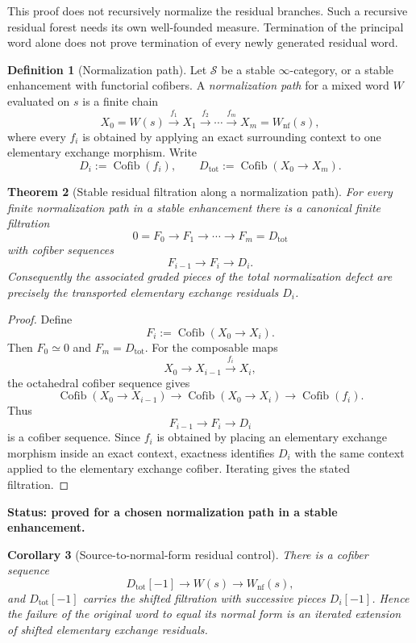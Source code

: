\documentclass[11pt]{article}
\newtheorem{theorem}{Theorem}[section]
\newtheorem{corollary}[theorem]{Corollary}
\theoremstyle{definition}
\newtheorem{definition}[theorem]{Definition}
\theoremstyle{remark}
\newcommand{\Cofib}{\operatorname{Cofib}}
\newcommand{\status}[1]{\textbf{Status: #1.}}
\begin{document}
This proof does not recursively normalize the residual branches. Such a recursive residual forest needs its own well-founded measure. Termination of the principal word alone does not prove termination of every newly generated residual word.

\begin{definition}[Normalization path]
Let $\mathcal S$ be a stable $\infty$-category, or a stable enhancement with functorial cofibers. A \emph{normalization path} for a mixed word $W$ evaluated on $s$ is a finite chain
\[
X_0=W(s)\xrightarrow{f_1}X_1\xrightarrow{f_2}\cdots\xrightarrow{f_m}X_m=W_{\mathrm{nf}}(s),
\]
where every $f_i$ is obtained by applying an exact surrounding context to one elementary exchange morphism. Write
\[
D_i:=\Cofib(f_i),
\qquad
D_{\mathrm{tot}}:=\Cofib(X_0\to X_m).
\]
\end{definition}

\begin{theorem}[Stable residual filtration along a normalization path]\label{thm:stable-filtration}
For every finite normalization path in a stable enhancement there is a canonical finite filtration
\[
0=F_0\longrightarrow F_1\longrightarrow\cdots\longrightarrow F_m=D_{\mathrm{tot}}
\]
with cofiber sequences
\[
F_{i-1}\longrightarrow F_i\longrightarrow D_i.
\]
Consequently the associated graded pieces of the total normalization defect are precisely the transported elementary exchange residuals $D_i$.
\end{theorem}

\begin{proof}
Define
\[
F_i:=\Cofib(X_0\longrightarrow X_i).
\]
Then $F_0\simeq0$ and $F_m=D_{\mathrm{tot}}$. For the composable maps
\[
X_0\longrightarrow X_{i-1}\xrightarrow{f_i}X_i,
\]
the octahedral cofiber sequence gives
\[
\Cofib(X_0\to X_{i-1})
\longrightarrow
\Cofib(X_0\to X_i)
\longrightarrow
\Cofib(f_i).
\]
Thus
\[
F_{i-1}\longrightarrow F_i\longrightarrow D_i
\]
is a cofiber sequence. Since $f_i$ is obtained by placing an elementary exchange morphism inside an exact context, exactness identifies $D_i$ with the same context applied to the elementary exchange cofiber. Iterating gives the stated filtration.
\end{proof}

\status{proved for a chosen normalization path in a stable enhancement}

\begin{corollary}[Source-to-normal-form residual control]\label{cor:source-normal-control}
There is a cofiber sequence
\[
D_{\mathrm{tot}}[-1]\longrightarrow W(s)\longrightarrow W_{\mathrm{nf}}(s),
\]
and $D_{\mathrm{tot}}[-1]$ carries the shifted filtration with successive pieces $D_i[-1]$. Hence the failure of the original word to equal its normal form is an iterated extension of shifted elementary exchange residuals.
\end{corollary}
\end{document}

